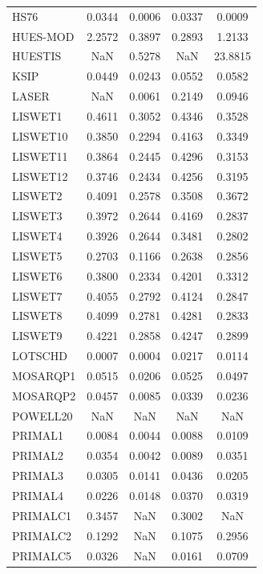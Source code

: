 \begin{longtable}{lcccc}
HS76     &   0.0344 &   0.0006 &   0.0337 &   0.0009 \\
HUES-MOD &   2.2572 &   0.3897 &   0.2893 &   1.2133 \\
HUESTIS  &      NaN &   0.5278 &      NaN &  23.8815 \\
KSIP     &   0.0449 &   0.0243 &   0.0552 &   0.0582 \\
LASER    &      NaN &   0.0061 &   0.2149 &   0.0946 \\
LISWET1  &   0.4611 &   0.3052 &   0.4346 &   0.3528 \\
LISWET10 &   0.3850 &   0.2294 &   0.4163 &   0.3349 \\
LISWET11 &   0.3864 &   0.2445 &   0.4296 &   0.3153 \\
LISWET12 &   0.3746 &   0.2434 &   0.4256 &   0.3195 \\
LISWET2  &   0.4091 &   0.2578 &   0.3508 &   0.3672 \\
LISWET3  &   0.3972 &   0.2644 &   0.4169 &   0.2837 \\
LISWET4  &   0.3926 &   0.2644 &   0.3481 &   0.2802 \\
LISWET5  &   0.2703 &   0.1166 &   0.2638 &   0.2856 \\
LISWET6  &   0.3800 &   0.2334 &   0.4201 &   0.3312 \\
LISWET7  &   0.4055 &   0.2792 &   0.4124 &   0.2847 \\
LISWET8  &   0.4099 &   0.2781 &   0.4281 &   0.2833 \\
LISWET9  &   0.4221 &   0.2858 &   0.4247 &   0.2899 \\
LOTSCHD  &   0.0007 &   0.0004 &   0.0217 &   0.0114 \\
MOSARQP1 &   0.0515 &   0.0206 &   0.0525 &   0.0497 \\
MOSARQP2 &   0.0457 &   0.0085 &   0.0339 &   0.0236 \\
POWELL20 &      NaN &      NaN &      NaN &      NaN \\
PRIMAL1  &   0.0084 &   0.0044 &   0.0088 &   0.0109 \\
PRIMAL2  &   0.0354 &   0.0042 &   0.0089 &   0.0351 \\
PRIMAL3  &   0.0305 &   0.0141 &   0.0436 &   0.0205 \\
PRIMAL4  &   0.0226 &   0.0148 &   0.0370 &   0.0319 \\
PRIMALC1 &   0.3457 &      NaN &   0.3002 &      NaN \\
PRIMALC2 &   0.1292 &      NaN &   0.1075 &   0.2956 \\
PRIMALC5 &   0.0326 &      NaN &   0.0161 &   0.0709 \\

\end{longtable}

